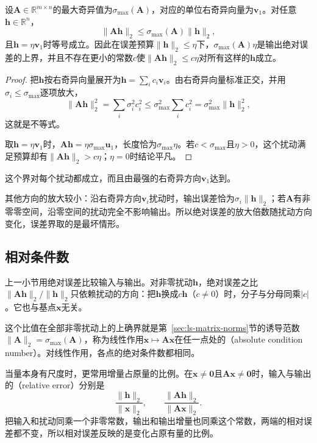 \begin{theorem}[线性作用的绝对误差界]
\label{thm:ls-absolute-error-bound}
设$\bm A\in\mathbb R^{m\times n}$的最大奇异值为$\sigma_{\max}(\bm A)$，对应的单位右奇异向量为$\bm v_1$。对任意$\bm h\in\mathbb R^n$，
\begin{equation}
 \lVert\bm A\bm h\rVert_2\leq\sigma_{\max}(\bm A)\lVert\bm h\rVert_2 ,
 \label{eq:ls-absolute-error-bound}
\end{equation}
且$\bm h=\eta\bm v_1$时等号成立。因此在误差预算$\lVert\bm h\rVert_2\leq\eta$下，$\sigma_{\max}(\bm A)\eta$是输出绝对误差的上界，并且不存在更小的常数$c$使$\lVert\bm A\bm h\rVert_2\leq c\eta$对所有这样的$\bm h$成立。
\end{theorem}
\begin{proof}
把$\bm h$按右奇异向量展开为$\bm h=\sum_ic_i\bm v_i$。由右奇异向量标准正交，并用$\sigma_i\leq\sigma_{\max}$逐项放大，
\[
 \lVert\bm A\bm h\rVert_2^2=\sum_i\sigma_i^2c_i^2\leq\sigma_{\max}^2\sum_ic_i^2=\sigma_{\max}^2\lVert\bm h\rVert_2^2 ,
\]
这就是不等式。

取$\bm h=\eta\bm v_1$时，$\bm A\bm h=\eta\sigma_{\max}\bm u_1$，长度恰为$\sigma_{\max}\eta$。若$c<\sigma_{\max}$且$\eta>0$，这个扰动满足预算却有$\lVert\bm A\bm h\rVert_2>c\eta$；$\eta=0$时结论平凡。
\end{proof}

这个界对每个扰动都成立，而且由最强的右奇异方向$\bm v_1$达到。

其他方向的放大较小：沿右奇异方向$\bm v_i$扰动时，输出误差恰为$\sigma_i\lVert\bm h\rVert_2$；若$\bm A$有非零零空间，沿零空间的扰动完全不影响输出。所以绝对误差的放大倍数随扰动方向变化，误差界取的是最坏情形。

\subsection{相对条件数}
\label{sec:ls-perturbation-conditioning}

上一小节用绝对误差比较输入与输出。对非零扰动$\bm h$，绝对误差之比$\lVert\bm A\bm h\rVert_2/\lVert\bm h\rVert_2$只依赖扰动的方向：把$\bm h$换成$c\bm h$（$c\neq0$）时，分子与分母同乘$|c|$。它也与基点$\bm x$无关。

这个比值在全部非零扰动上的上确界就是第~\ref{sec:ls-matrix-norms}节的诱导范数$\lVert\bm A\rVert_2=\sigma_{\max}(\bm A)$，称为线性作用$\bm x\mapsto\bm A\bm x$在任一点处的（absolute condition number）。对线性作用，各点的绝对条件数都相同。

当量本身有尺度时，更常用增量占原量的比例。在$\bm x\neq\bm0$且$\bm A\bm x\neq\bm0$时，输入与输出的（relative error）分别是
\[
 \frac{\lVert\bm h\rVert_2}{\lVert\bm x\rVert_2},\qquad
 \frac{\lVert\bm A\bm h\rVert_2}{\lVert\bm A\bm x\rVert_2}.
\]
把输入和扰动同乘一个非零常数，输出和输出增量也同乘这个常数，两端的相对误差都不变，所以相对误差反映的是变化占原有量的比例。


